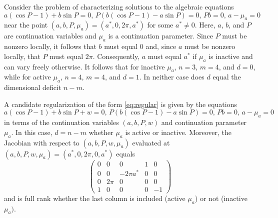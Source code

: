 Consider the problem of characterizing solutions to the algebraic equations
\begin{equation}
\label{eq:singularex}
a(\cos P-1)+b\sin P=0,\,P(b(\cos P-1)-a\sin P)=0,\,Pb=0,\,a-\mu_a=0
\end{equation}
near the point $(a,b,P,\mu_a)=(a^*,0,2\pi,a^*)$ for some $a^*\ne 0$. Here, $a$, $b$, and $P$ are continuation variables and $\mu_a$ is a continuation parameter. Since $P$ must be nonzero locally, it follows that $b$ must equal $0$ and, since $a$ must be nonzero locally, that $P$ must equal $2\pi$. Consequently, $a$ must equal $a^*$ if $\mu_a$ is inactive and can vary freely otherwise. It follows that for inactive $\mu_a$, $n=3$, $m=4$, and $d=0$, while for active $\mu_a$, $n=4$, $m=4$, and $d=1$. In neither case does $d$ equal the dimensional deficit $n-m$.

A candidate regularization of the form \eqref{eq:regular} is given by the equations
\begin{equation}
a(\cos P-1)+b\sin P+w=0,\,P(b(\cos P-1)-a\sin P)=0,\,Pb=0,\,a-\mu_a=0
\end{equation}
in terms of the continuation variables $(a,b,P,w)$ and continuation parameter $\mu_a$. In this case, $d=n-m$ whether $\mu_a$ is active or inactive. Moreover, the Jacobian with respect to $(a,b,P,w,\mu_a)$ evaluated at $(a,b,P,w,\mu_a)=(a^*,0,2\pi,0,a^*)$ equals
\begin{equation}
\begin{pmatrix}0 & 0 & 0 & 1 & 0\\0 & 0 & -2\pi a^* & 0 & 0\\0 & 2\pi & 0 & 0 & 0\\1 & 0 & 0 & 0 & -1\end{pmatrix}
\end{equation}
and is full rank whether the last column is included (active $\mu_a$) or not (inactive $\mu_a)$.

